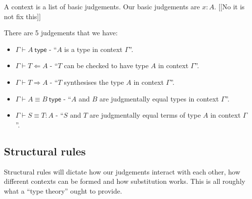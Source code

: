 A context is a list of basic judgements. Our basic judgements are $x : A$. [[No it is not fix this]]

There are 5 judgements that we have:

\begin{itemize}
    \item $\Gamma \vdash A\ \mathsf{type}$ - ``$A$ is a type in context $\Gamma$''.
    \item $\Gamma \vdash T \Leftarrow A$ - ``$T$ can be checked to have type $A$ in context $\Gamma$''.
    \item $\Gamma \vdash T \Rightarrow A$ - ``$T$ synthesises the type $A$ in context $\Gamma$''.
    \item $\Gamma \vdash A \equiv B\ \mathsf{type}$ - ``$A$ and $B$ are judgmentally equal types in context $\Gamma$''.
    \item $\Gamma \vdash S \equiv T : A$ - ``$S$ and $T$ are judgmentally equal terms of type $A$ in context $\Gamma$''.
\end{itemize}

\subsection{Structural rules}

Structural rules will dictate how our judgements interact with each other, how different contexts can be formed and how substitution works. This is all roughly what a ``type theory'' ought to provide.

